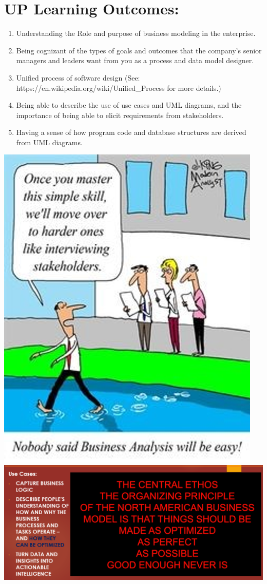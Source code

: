 \section{UP Learning Outcomes:}
\begin{enumerate}
    \item Understanding the Role and purpose of business modeling in the enterprise.
    \item Being cognizant of the types of goals and outcomes that the company's senior managers and leaders want from you as a process and data model designer.
    \item Unified process of software design (See: https://en.wikipedia.org/wiki/Unified_Process for more details.)
    \item Being able to describe the use of use cases and UML diagrams, and the importance of being able to elicit requirements from stakeholders.
    \item Having a sense of how program code and database structures are derived from UML diagrams. 
\end{enumerate}
\includegraphics[scale=1.2]{Interviewing Stakeholders.png}
\includegraphics[scale=1.2]{use cases.png}


